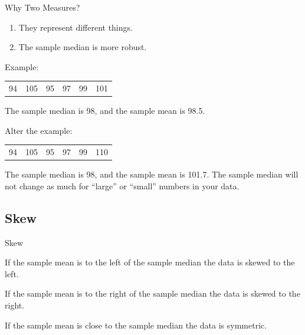 \begin{frame}{Why Two Measures?}

  \begin{enumerate}
  \item They represent different things.
  \item The sample median is more robust.
  \end{enumerate}

  {
    Example: \\
    \begin{tabular}{llllll}
      94 & 105 & 95 & 97  & 99 & 101
    \end{tabular}

    {
      The sample median is 98, and the sample mean is 98.5.
    }
  }

  {
    Alter the example: \\
    \begin{tabular}{llllll}
      94 & 105 & 95 & 97  & 99 & {\color{red}110}
    \end{tabular}

    {
      The sample median is 98, and the sample mean is 101.7. The
      sample median will not change as much for ``large'' or
      ``small'' numbers in your data.
    }
  }

  
  
\end{frame}

\subsection{Skew}

\begin{frame}{Skew}

  \begin{definition}
    If the sample mean is to the left of the sample median the data is
    skewed to the left.
  \end{definition}

  \begin{definition}
    If the sample mean is to the right of the sample median the data
    is skewed to the right.
  \end{definition}

  \begin{definition}[Symmetric]
    If the sample mean is close to the sample median the data is symmetric.
  \end{definition}
  
\end{frame}

